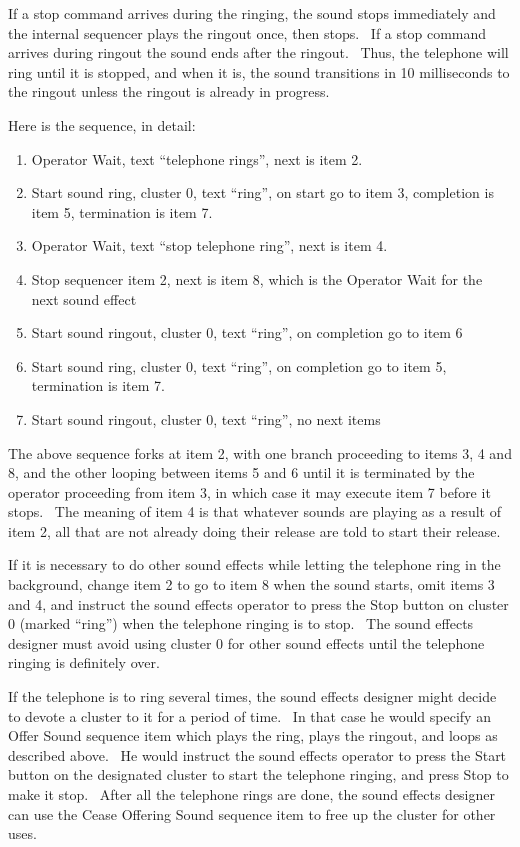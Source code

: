 \documentclass[letterpaper]{article}
\newcommand\liststyleLxvi{%
\renewcommand\theenumi{\arabic{enumi}}
\renewcommand\theenumii{\arabic{enumii}}
\renewcommand\theenumiii{\arabic{enumiii}}
\renewcommand\theenumiv{\arabic{enumiv}}
\renewcommand\labelenumi{\theenumi.}
\renewcommand\labelenumii{\theenumii.}
\renewcommand\labelenumiii{\theenumiii.}
\renewcommand\labelenumiv{\theenumiv.}
}
\begin{document}
If a stop command arrives during the ringing, the sound stops
immediately and the internal sequencer plays the ringout once, then
stops. \ If a stop command arrives during ringout the sound ends after
the ringout. \ Thus, the telephone will ring until it is stopped, and
when it is, the sound transitions in 10 milliseconds to the ringout
unless the ringout is already in progress.

Here is the sequence, in detail:

\liststyleLxvi
\begin{enumerate}
\item Operator Wait, text “telephone rings”, next is item 2.
\item Start sound ring, cluster 0, text “ring”, on start go to item 3,
completion is item 5, termination is item 7.
\item Operator Wait, text “stop telephone ring”, next is item 4.
\item Stop sequencer item 2, next is item 8, which is the Operator Wait
for the next sound effect
\item Start sound ringout, cluster 0, text “ring”, on completion go to
item 6
\item Start sound ring, cluster 0, text “ring”, on completion go to item
5, termination is item 7.
\item Start sound ringout, cluster 0, text “ring”, no next items
\end{enumerate}
The above sequence forks at item 2, with one branch proceeding to items
3, 4 and 8, and the other looping between items 5 and 6 until it is
terminated by the operator proceeding from item 3, in which case it may
execute item 7 before it stops. \ The meaning of item 4 is that
whatever sounds are playing as a result of item 2, all that are not
already doing their release are told to start their release.

If it is necessary to do other sound effects while letting the telephone
ring in the background, change item 2 to go to item 8 when the sound
starts, omit items 3 and 4, and instruct the sound effects operator to
press the Stop button on cluster 0 (marked “ring”) when the telephone
ringing is to stop. \ The sound effects designer must avoid using
cluster 0 for other sound effects until the telephone ringing is
definitely over.

If the telephone is to ring several times, the sound effects designer
might decide to devote a cluster to it for a period of time. \ In that
case he would specify an Offer Sound sequence item which plays the
ring, plays the ringout, and loops as described above. \ He would
instruct the sound effects operator to press the Start button on the
designated cluster to start the telephone ringing, and press Stop to
make it stop. \ After all the telephone rings are done, the sound
effects designer can use the Cease Offering Sound sequence item to free
up the cluster for other uses.
\end{document}
